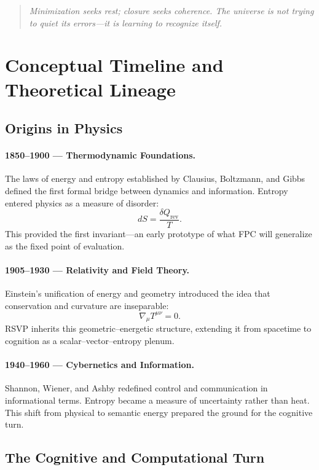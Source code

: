 \documentclass[12pt,a4paper]{article}
\begin{document}
\begin{quote}
\emph{Minimization seeks rest; closure seeks coherence.
The universe is not trying to quiet its errors—it is learning to recognize itself.}
\end{quote}

\section{Conceptual Timeline and Theoretical Lineage}

\subsection{Origins in Physics}

\paragraph{1850–1900 — Thermodynamic Foundations.}
The laws of energy and entropy established by Clausius, Boltzmann, and Gibbs
defined the first formal bridge between dynamics and information.
Entropy entered physics as a measure of disorder:
\[
dS = \frac{\delta Q_{\text{rev}}}{T}.
\]
This provided the first invariant—an early prototype of what FPC will generalize as the fixed point of evaluation.

\paragraph{1905–1930 — Relativity and Field Theory.}
Einstein’s unification of energy and geometry introduced
the idea that conservation and curvature are inseparable:
\[
\nabla_\mu T^{\mu\nu}=0.
\]
RSVP inherits this geometric–energetic structure,
extending it from spacetime to cognition as a scalar–vector–entropy plenum.

\paragraph{1940–1960 — Cybernetics and Information.}
Shannon, Wiener, and Ashby redefined control and communication in informational terms.
Entropy became a measure of uncertainty rather than heat.
This shift from physical to semantic energy prepared the ground for the cognitive turn.

\subsection{The Cognitive and Computational Turn}
\end{document}
